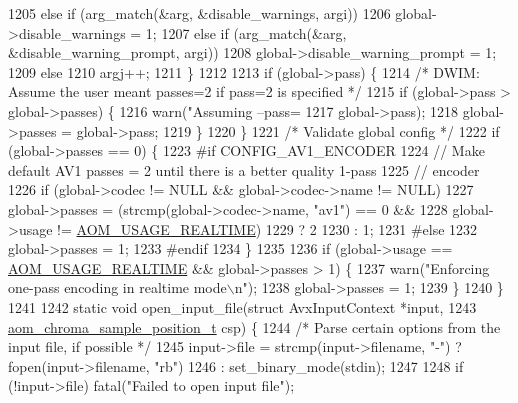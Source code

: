 \begin{DoxyCodeInclude}
{{{{{{{{{{{{{{1205     \textcolor{keywordflow}{else} \textcolor{keywordflow}{if} (arg\_match(&arg, &disable\_warnings, argi))
1206       global->disable\_warnings = 1;
1207     \textcolor{keywordflow}{else} \textcolor{keywordflow}{if} (arg\_match(&arg, &disable\_warning\_prompt, argi))
1208       global->disable\_warning\_prompt = 1;
1209     \textcolor{keywordflow}{else}
1210       argj++;
1211   \}
1212 
1213   \textcolor{keywordflow}{if} (global->pass) \{
1214     \textcolor{comment}{/* DWIM: Assume the user meant passes=2 if pass=2 is specified */}
1215     \textcolor{keywordflow}{if} (global->pass > global->passes) \{
1216       warn(\textcolor{stringliteral}{"Assuming --pass=%
1217            global->pass);
1218       global->passes = global->pass;
1219     \}
1220   \}
1221   \textcolor{comment}{/* Validate global config */}
1222   \textcolor{keywordflow}{if} (global->passes == 0) \{
1223 \textcolor{preprocessor}{#if CONFIG\_AV1\_ENCODER}
1224     \textcolor{comment}{// Make default AV1 passes = 2 until there is a better quality 1-pass}
1225     \textcolor{comment}{// encoder}
1226     \textcolor{keywordflow}{if} (global->codec != NULL && global->codec->name != NULL)
1227       global->passes = (strcmp(global->codec->name, \textcolor{stringliteral}{"av1"}) == 0 &&
1228                         global->usage != \hyperlink{group__encoder_gae2cc24d3083099df8eb60ad65f81c62f}{AOM\_USAGE\_REALTIME})
1229                            ? 2
1230                            : 1;
1231 \textcolor{preprocessor}{#else}
1232     global->passes = 1;
1233 \textcolor{preprocessor}{#endif}
1234   \}
1235 
1236   \textcolor{keywordflow}{if} (global->usage == \hyperlink{group__encoder_gae2cc24d3083099df8eb60ad65f81c62f}{AOM\_USAGE\_REALTIME} && global->passes > 1) \{
1237     warn(\textcolor{stringliteral}{"Enforcing one-pass encoding in realtime mode\(\backslash\)n"});
1238     global->passes = 1;
1239   \}
1240 \}
1241 
1242 \textcolor{keyword}{static} \textcolor{keywordtype}{void} open\_input\_file(\textcolor{keyword}{struct} AvxInputContext *input,
1243                             \hyperlink{aom__image_8h_a48f259fc7774b1c799b3ebe7530c19bd}{aom\_chroma\_sample\_position\_t} csp) \{
1244   \textcolor{comment}{/* Parse certain options from the input file, if possible */}
1245   input->file = strcmp(input->filename, \textcolor{stringliteral}{"-"}) ? fopen(input->filename, \textcolor{stringliteral}{"rb"})
1246                                              : set\_binary\_mode(stdin);
1247 
1248   \textcolor{keywordflow}{if} (!input->file) fatal(\textcolor{stringliteral}{"Failed to open input file"});
}}}}}}}}}}}}}}}
\end{DoxyCodeInclude}
